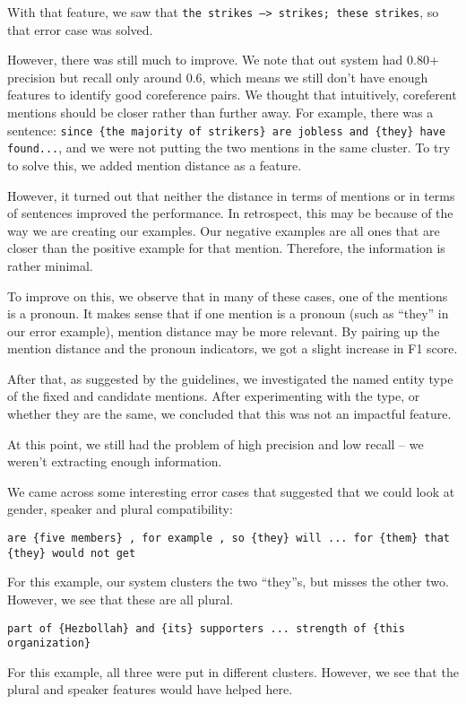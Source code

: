 \documentclass[12pt, twocolumn]{article}
\begin{document}
With that feature, we saw that \texttt{{the strikes} -->  {strikes}; {these strikes}}, so that error case was solved. 

However, there was still much to improve. We note that out system had 0.80+ precision but recall only around 0.6, which means we still don't have enough features to identify good coreference pairs. We thought that intuitively, coreferent mentions should be closer rather than further away. For example, there was a sentence: \texttt{since \{{the majority of strikers\}} are jobless and {\{they\}} have found...}, and we were not putting the two mentions in the same cluster. To try to solve this, we added mention distance as a feature.

However, it turned out that neither the distance in terms of mentions or in terms of sentences improved the performance. In retrospect, this may be because of the way we are creating our examples. Our negative examples are all ones that are closer than the positive example for that mention. Therefore, the information is rather minimal.

To improve on this, we observe that in many of these cases, one of the mentions is a pronoun. It makes sense that if one mention is a pronoun (such as ``they'' in our error example), mention distance may be more relevant. By pairing up the mention distance and the pronoun indicators, we got a slight increase in F1 score.

After that, as suggested by the guidelines, we investigated the named entity type of the fixed and candidate mentions. After experimenting with the type, or whether they are the same, we concluded that this was not an impactful feature.

At this point, we still had the problem of high precision and low recall -- we weren't extracting enough information.

We came across some interesting error cases that suggested that we could look at gender, speaker and plural compatibility:

\texttt{are \{{five members\}} , for example , so \{{they\}} will ... for \{{them\}} that \{{they\}} would not get}

For this example, our system clusters the two ``they''s, but misses the other two. However, we see that these are all plural.

\texttt{part of {\{Hezbollah\}} and {\{its}\} supporters ... strength of \{{this organization}\}}

For this example, all three were put in different clusters. However, we see that the plural and speaker features would have helped here.
\end{document}
